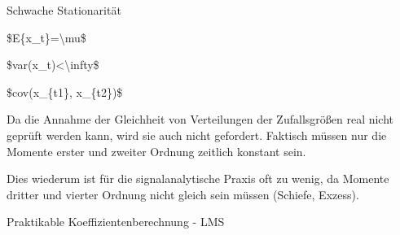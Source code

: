 \documentclass[a4paper]{article}
\begin{document}
\begin{multicols}{3}
  Schwache Stationarität

  \begin{itemize*}
    \item \$E\{x\_t\}=\textbackslash mu\$
    \item \$var(x\_t)\textless\textbackslash infty\$
    \item \$cov(x\_\{t1\}, x\_\{t2\})\$
    \item Da die Annahme der Gleichheit von Verteilungen der Zufallsgrößen real nicht geprüft werden kann, wird sie auch nicht gefordert. Faktisch müssen nur die Momente erster und zweiter Ordnung zeitlich konstant sein.
    \item Dies wiederum ist für die signalanalytische Praxis oft zu wenig, da Momente dritter und vierter Ordnung nicht gleich sein müssen (Schiefe, Exzess).
  \end{itemize*}

  Praktikable Koeffizientenberechnung - LMS


\end{multicols}
\end{document}
